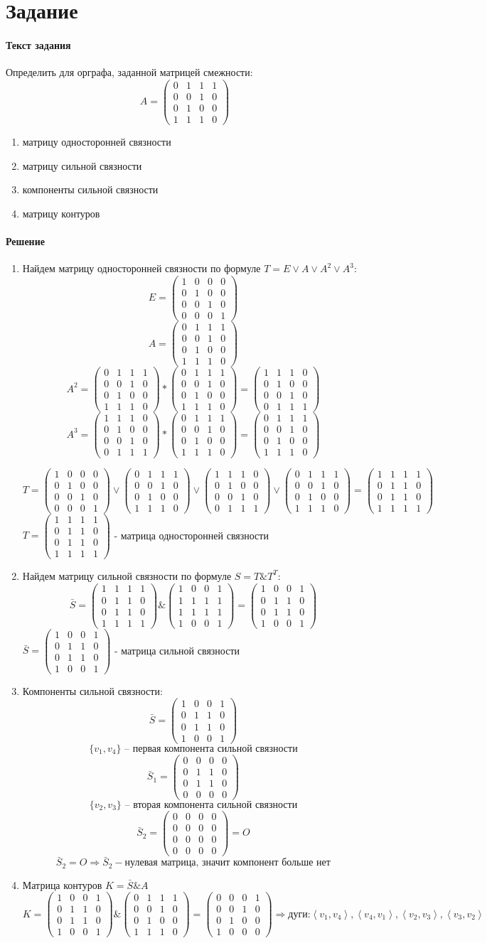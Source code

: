 \documentclass[a4paper, 12pt]{article}
\newcommand{\RNum}[1]{\uppercase\expandafter{\romannumeral #1\relax}}
\newcommand{\E}{\begin{pmatrix}
    1 & 0 & 0 & 0 \\
    0 & 1 & 0 & 0 \\
    0 & 0 & 1 & 0 \\
    0 & 0 & 0 & 1
\end{pmatrix}} %
\newcommand{\A}{\begin{pmatrix}
    0 & 1 & 1 & 1 \\
    0 & 0 & 1 & 0 \\
    0 & 1 & 0 & 0 \\
    1 & 1 & 1 & 0
\end{pmatrix}} %
\newcommand{\Apowtwo}{\begin{pmatrix}
    1 & 1 & 1 & 0 \\
    0 & 1 & 0 & 0 \\
    0 & 0 & 1 & 0 \\
    0 & 1 & 1 & 1
\end{pmatrix}} %
\newcommand{\T}{\begin{pmatrix}
    1 & 1 & 1 & 1\\
    0 & 1 & 1 & 0\\
    0 & 1 & 1 & 0\\
    1 & 1 & 1 & 1
\end{pmatrix}} %
\newcommand{\Smatrix}{\begin{pmatrix}
    1 & 0 & 0 & 1\\
    0 & 1 & 1 & 0\\
    0 & 1 & 1 & 0\\
    1 & 0 & 0 & 1
\end{pmatrix}} %
\newcommand{\Sone}{\begin{pmatrix}
    0 & 0 & 0 & 0\\
    0 & 1 & 1 & 0\\
    0 & 1 & 1 & 0\\
    0 & 0 & 0 & 0
\end{pmatrix}} %
\newcommand{\Omatrix}{\begin{pmatrix}
    0 & 0 & 0 & 0\\
    0 & 0 & 0 & 0\\
    0 & 0 & 0 & 0\\
    0 & 0 & 0 & 0
\end{pmatrix}} %
\newcommand{\K}{
    \begin{pmatrix}
        0 & 0 & 0 & 1\\
        0 & 0 & 1 & 0\\
        0 & 1 & 0 & 0\\
        1 & 0 & 0 & 0
    \end{pmatrix}
}
\begin{document}
\section*{Задание \RNum{1}}
\paragraph{Текст задания} 
Определить для орграфа, заданной матрицей смежности:
$$ A = \begin{pmatrix}
    0 & 1 & 1 & 1 \\
    0 & 0 & 1 & 0 \\
    0 & 1 & 0 & 0 \\
    1 & 1 & 1 & 0
\end{pmatrix} $$
\begin{enumerate}[label=\asbuk*)]
    \item матрицу односторонней связности
    \item матрицу сильной связности
    \item компоненты сильной связности
    \item матрицу контуров
\end{enumerate}
\paragraph{Решение}
\begin{enumerate}[label=\asbuk*)]
    \item Найдем матрицу односторонней связности по формуле $ T = E \vee A \vee A^2 \vee A^3$:
    $$ E = \E $$
    $$
    A = \A
    $$
    $$
    A^2 = \A \ast \A = \Apowtwo
    $$
    $$
    A^3 = \Apowtwo \ast \A = \A
    $$

    $$
    T = \E \vee \A \vee \Apowtwo \vee \A = \T
    $$
    $ T = \T$ - матрица односторонней связности
    \item Найдем матрицу сильной связности по формуле $ S = T \& T^T$:
    $$ \bar{S} = \T \& 
    \begin{pmatrix}
        1 & 0 & 0 & 1\\
        1 & 1 & 1 & 1\\
        1 & 1 & 1 & 1\\
        1 & 0 & 0 & 1
    \end{pmatrix} = \Smatrix
    $$
    $ \bar{S} = \Smatrix$ - матрица сильной связности
    \newpage
    \item Компоненты сильной связности:
    $$ \bar{S} = \Smatrix $$
    $$ \{v_1, v_4\} \text{ -- первая компонента сильной связности} $$
    $$ \bar{S}_1  = \Sone $$
    $$ \{v_2, v_3\} \text{ -- вторая компонента сильной связности}$$
    $$ \bar{S}_2 = \Omatrix = O $$
    $$ \bar{S}_2 = O \Rightarrow \bar{S}_2 - \text{нулевая матрица, значит компонент больше нет} $$
    \item Матрица контуров $ K = \bar{S} \& A $
    $$ K = \Smatrix \& \A = \K \Rightarrow \text{дуги:} \left<v_1,v_4\right>, \left<v_4,v_1\right>, \left<v_2,v_3\right>, \left<v_3,v_2\right>$$
\end{enumerate}
\end{document}
